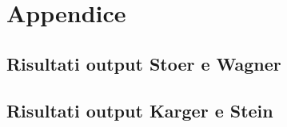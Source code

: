 \section{Appendice}

\subsection{Risultati output Stoer e Wagner}

\subsection{Risultati output Karger e Stein}